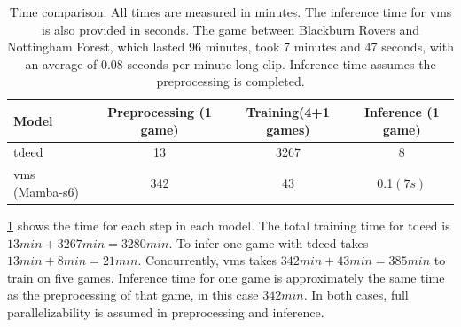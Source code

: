 \begin{table}
    \centering
    \begin{tabular}{lccc}
        \toprule 
        Model & Preprocessing (1 game)  & Training(4+1 games) & Inference (1 game) \\
        \midrule
        \acrshort{tdeed} & 13 & 3267 & 8\\
        \acrshort{vms} (Mamba-\acrshort{s6}) & 342 & 43 & 0.1$(7s)$ \\
        \bottomrule
    \end{tabular}
    \caption{Time comparison. All times are measured in minutes. The inference time for \acrshort{vms} is also provided in seconds. The game between Blackburn Rovers and Nottingham Forest, which lasted 96 minutes, took 7 minutes and 47 seconds, with an average of 0.08 seconds per minute-long clip. Inference time assumes the preprocessing is completed.}
    \label{tab:results_ex2}
\end{table}

\cref{tab:results_ex2} shows the time for each step in each model. The total training time for \acrshort{tdeed} is \(13min+3267min= 3280min\). To infer one game with \acrshort{tdeed} takes \(13min + 8min = 21min \). Concurrently, \acrshort{vms} takes \(342min+43min=385min\) to train on five games. Inference time for one game is approximately the same time as the preprocessing of that game, in this case \(342min\). In both cases, full parallelizability is assumed in preprocessing and inference. 

